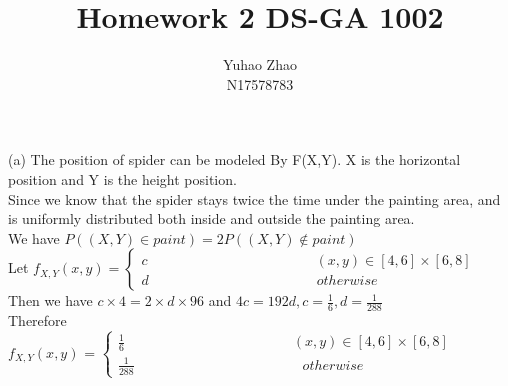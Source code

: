 \documentclass[11pt]{article}
\newenvironment{problem}[2][Problem]{\begin{trivlist}
\item[\hskip \labelsep {\bfseries #1}\hskip \labelsep {\bfseries #2.}]}{\end{trivlist}}
\begin{document}
 
 
\title{Homework 2 DS-GA 1002 }%
\author{Yuhao Zhao\\ %
N17578783} %
 
\maketitle
\begin{problem}{1}
\end{problem}
(a) The position of spider can be modeled By F(X,Y). X is the horizontal position and Y is the height position. \\
Since we know that the spider stays twice the time under the painting area, and is uniformly distributed both inside and outside the painting area.\\
We have $P((X,Y)\in paint) = 2 P((X,Y)\notin paint )$\\
Let $
f_{X,Y}(x,y)  =
\begin{cases}
	c   \hspace{2in}  (x,y) \in [4,6] \times [6,8] \\
	d  \hspace{2in}  otherwise
\end{cases}
$\\
Then we have $c \times 4 = 2\times d\times 96$ and $4c = 192d, c = \frac{1}{6}, d = \frac{1}{288}$ \\
Therefore\\
$f_{X,Y}(x,y)$  =
$\begin{cases}
\frac{1}{6}   \hspace{2in} (x,y) \in [4,6] \times [6,8] \\
\frac{1}{288}  \hspace{2in}  otherwise
\end{cases}$\\
\end{document}
